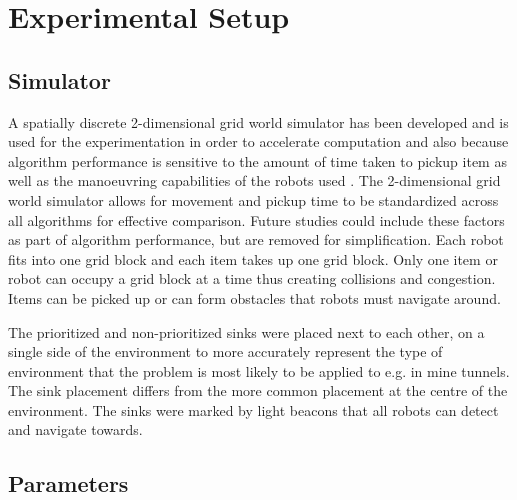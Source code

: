 
\chapter{Experimental Setup}
\label{chap:third}



\section{Simulator}
A spatially discrete 2-dimensional grid world simulator has been developed and is used for the experimentation in order to accelerate computation \cite{sugawara2002swarming} and also because algorithm performance is sensitive to the amount of time taken to pickup item as well as the manoeuvring capabilities of the robots used \cite{ostergaard2001emergent}. The 2-dimensional grid world simulator allows for movement and pickup time to be standardized across all algorithms for effective comparison. Future studies could include these factors as part of algorithm performance, but are removed for simplification. Each robot fits into one grid block and each item takes up one grid block. Only one item or robot can occupy a grid block at a time thus creating collisions and congestion. Items can be picked up or can form obstacles that robots must navigate around.

The prioritized and non-prioritized sinks were placed next to each other, on a single side of the environment to more accurately represent the type of environment that the problem is most likely to be applied to e.g. in mine tunnels. The sink placement differs from the more common placement at the centre of the environment. The sinks were marked by light beacons that all robots can detect and navigate towards.

\section{Parameters}
\label{parameters}

